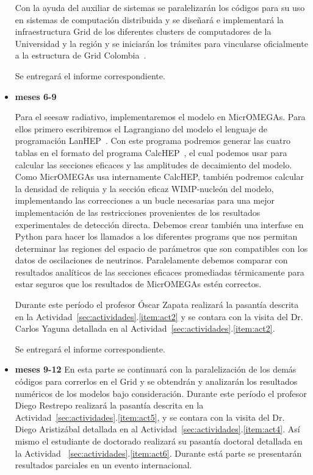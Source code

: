\begin{itemize}
\begin{gravitinodm}
  Con la ayuda del auxiliar de sistemas se paralelizarán los códigos
  para su uso en sistemas de computación distribuida y se diseñará e
  implementará la infraestructura Grid de los diferentes clusters de
  computadores de la Universidad y la región y se iniciarán los
  trámites para vincularse oficialmente a la estructura de Grid
  Colombia~\cite{gridcolombia}.

  Se entregará el informe correspondiente.
\end{gravitinodm}

\item \textbf{meses 6-9}

\begin{darkmatter}
  Para el seesaw radiativo, implementaremos el modelo en MicrOMEGAs.
  Para ellos primero escribiremos el Lagrangiano del modelo el
  lenguaje de programación LanHEP~\cite{Semenov:2008jy}. Con este
  programa podremos generar las cuatro tablas en el formato del
  programa CalcHEP~\cite{Pukhov:2004ca}, el cual podemos usar para
  calcular las secciones eficaces y las amplitudes de decaimiento del
  modelo.  Como MicrOMEGAs usa internamente CalcHEP, también podremos
  calcular la densidad de reliquia y la sección eficaz WIMP-nucleón
  del modelo, implementando las correcciones a un bucle necesarias
  para una mejor implementación de las restricciones provenientes de
  los resultados experimentales de detección directa. Debemos crear
  también una interfase en Python para hacer los llamados a los
  diferentes programs que nos permitan determinar las regiones del
  espacio de parámetros que son compatibles con los datos de
  oscilaciones de neutrinos. Paralelamente debemos comparar con
  resultados analíticos de las secciones eficaces promediadas
  térmicamente para estar seguros que los resultados de MicrOMEGAs
  estén correctos.

  Durante este período el profesor Óscar Zapata realizará la pasantía
  descrita en la Actividad~\ref{sec:actividades}.\ref{item:act2} y se
  contara con la visita del Dr. Carlos Yaguna detallada en al
  Actividad~\ref{sec:actividades}.\ref{item:act2}.
\end{darkmatter}

  Se entregará el informe correspondiente.

\item \textbf{meses 9-12} En esta parte se continuará con la
  paralelización de los demás códigos para correrlos en el Grid y se
  obtendrán y analizarán los resultados numéricos de los modelos bajo
  consideración.  Durante este período el profesor Diego Restrepo
  realizará la pasantía descrita en la
  Actividad~\ref{sec:actividades}.\ref{item:act5}, y se contara con
  la visita del Dr. Diego Aristizábal detallada en al
  Actividad~\ref{sec:actividades}.\ref{item:act4}. Así mismo el
  estudiante de doctorado realizará su pasantía doctoral detallada en
  la Actividad ~\ref{sec:actividades}.\ref{item:act6}. Durante está
  parte se presentarán resultados parciales en un evento
  internacional.


\end{itemize}
